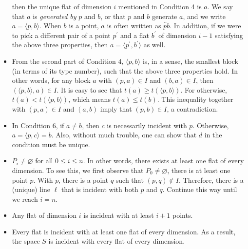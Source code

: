 \documentclass[12pt]{article}
\begin{document}
\begin{itemize}
then the unique flat of dimension $i$ mentioned in Condition 4 is $a$.  We say that $a$ is \emph{generated by} $p$ and $b$, or that $p$ and $b$ generate $a$, and we write $a=\langle p, b\rangle$.  When $b$ is a point, $a$ is often written as $\overleftrightarrow{pb}$.  In addition, if we were to pick a different pair of a point $p^{\prime}$ and a flat $b^{\prime}$ of dimension $i-1$ satisfying the above three properties, then $a=\langle p^{\prime},b^{\prime}\rangle$ as well.
\item From the second part of Condition 4, $\langle p,b\rangle$ is, in a sense, the smallest block (in terms of its type number), such that the above three properties hold. In other words, for any block $a$ with $(p,a)\in I$ and $(b,a)\in I$, then $(\langle p,b\rangle,a)\in I$.  It is easy to see that $t(a)\geq t(\langle p,b\rangle)$. For otherwise, $t(a)<t(\langle p,b\rangle)$, which means $t(a)\leq t(b)$.  This inequality together with $(p,a)\in I$ and $(a,b)$ imply
that $(p,b)\in I$, a contradiction.
\item In Condition 6, if $a\neq b$, then $c$ is necessarily incident with $p$.  Otherwise, $a=\langle p,c\rangle=b$.  Also, without much trouble, one can show that $d$ in the condition must be unique.
\item $P_i\neq\varnothing$ for all $0\leq i\leq n$.  In other words, there exists at least one flat of every dimension.  To see this, we first observe that $P_0\neq\varnothing$, there is at least one point $p$.  With $p$, there is a point $q$ such that $(p,q)\notin I$.  Therefore, there is a (unique) line $\ell$ that is incident with
both $p$ and $q$.  Continue this way until we reach $i=n$.
\item Any flat of dimension $i$ is incident with at least $i+1$ points.
\item Every flat is incident with at least one flat of every dimension.
As a result, the space $S$ is incident with every flat of every dimension.
\end{itemize}
\end{document}
